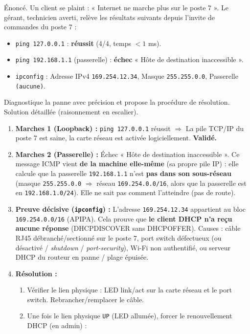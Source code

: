 \documentclass[11pt]{article}
\begin{document}
\begin{exoresolu}
Énoncé. Un client se plaint : « Internet ne marche plus sur le poste 7 ». Le gérant, technicien averti, relève les résultats suivants depuis l'invite de commandes du poste 7 :
\begin{itemize}
\item \texttt{ping 127.0.0.1} : \textbf{réussit} (4/4, temps $<1$ ms).
\item \texttt{ping 192.168.1.1} (passerelle) : \textbf{échec} « Hôte de destination inaccessible ».
\item \texttt{ipconfig} : Adresse IPv4 \texttt{169.254.12.34}, Masque \texttt{255.255.0.0}, Passerelle \texttt{(aucune)}.
\end{itemize}
Diagnostique la panne avec précision et propose la procédure de résolution.
\tcblower
Solution détaillée (raisonnement en escalier).
\begin{enumerate}
\item \textbf{Marches 1 (Loopback) :} \texttt{ping 127.0.0.1} réussit $\Rightarrow$ La pile TCP/IP du poste 7 est saine, la carte réseau est activée logiciellement. \textbf{Validé.}
\item \textbf{Marches 2 (Passerelle) :} Échec « Hôte de destination inaccessible ». Ce message ICMP vient \textbf{de la machine elle-même} (sa propre pile IP) : elle calcule que la passerelle \texttt{192.168.1.1} n'est \textbf{pas dans son sous-réseau} (masque \texttt{255.255.0.0} $\Rightarrow$ réseau \texttt{169.254.0.0/16}, alors que la passerelle est en \texttt{192.168.1.0/24}). Elle ne sait pas comment l'atteindre (pas de route).
\item \textbf{Preuve décisive (\texttt{ipconfig}) :} L'adresse \texttt{169.254.12.34} appartient au bloc \texttt{169.254.0.0/16} (APIPA). Cela prouve que \textbf{le client DHCP n'a reçu aucune réponse} (DHCPDISCOVER sans DHCPOFFER). Causes : câble RJ45 débranché/sectionné sur le poste 7, port switch défectueux (ou désactivé / \emph{shutdown} / \emph{port-security}), Wi-Fi non authentifié, ou serveur DHCP du routeur en panne / plage épuisée.
\item \textbf{Résolution :}
      \begin{enumerate}
      \item Vérifier le lien physique : LED link/act sur la carte réseau et le port switch. Rebrancher/remplacer le câble.
      \item Une fois le lien physique \texttt{UP} (LED allumée), forcer le renouvellement DHCP (en admin) :

\end{enumerate}
\end{enumerate}
\end{exoresolu}
\end{document}
